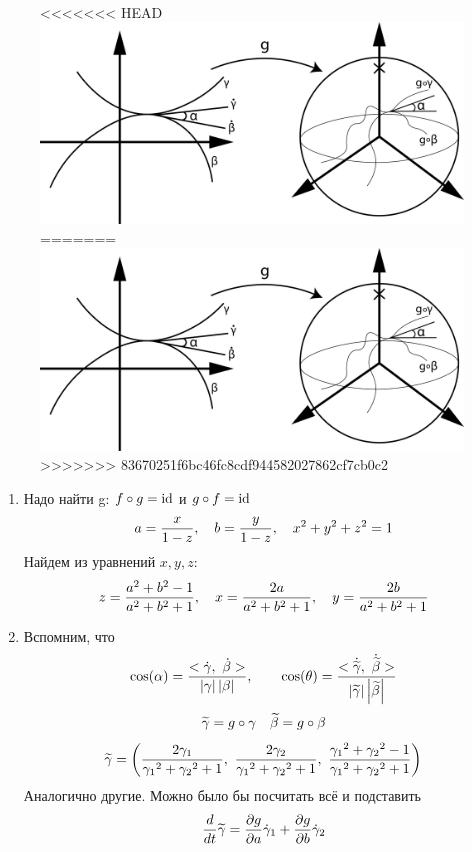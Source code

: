 \documentclass[12pt, fleqn]{article}
\begin{document}
\begin{sol} \
  \begin{figure}[H]
<<<<<<< HEAD
      \includegraphics[scale=0.3]{pics/7_1.png}
=======
      \includegraphics[scale=0.18]{pics/7_1}
>>>>>>> 83670251f6bc46fc8cdf944582027862cf7cb0c2
      \centering
  \end{figure}
  \begin{enumerate}
    \item Надо найти g: $f \circ g = \mathop{\rm id}\nolimits$ и $g \circ f = \mathop{\rm id}\nolimits$
    \[a = \dfrac{x}{1-z},\quad b = \dfrac{y}{1-z},\quad x^2 + y^2 + z^2 = 1\]
    Найдем из уравнений $x,y,z$:
    \[z = \dfrac{a^2 + b^2 - 1}{a^2 + b^2 + 1},\quad
    x = \dfrac{2a}{a^2 + b^2 + 1},\quad
    y=\dfrac{2b}{a^2 + b^2 + 1}\]
    \item Вспомним, что
    \[\cos (\alpha) = \dfrac{<\dot{\gamma},\ \dot{\beta}>}{\abs{\gamma} \abs{\beta}},\qq
    \cos (\theta) = \dfrac{<\dot{\w{\gamma}},\ \dot{\w{\beta}}>}{\abs{\w{\gamma}} \abs{\w{\beta}}}\]
    \[\widetilde{\gamma} = g \circ \gamma\quad \widetilde{\beta} = g \circ \beta\]
    \[\widetilde{\gamma} = \left(
      \dfrac{2 \gamma_1}{{\gamma_1}^2 + {\gamma_2}^2 + 1},\
      \dfrac{2 \gamma_2}{{\gamma_1}^2 + {\gamma_2}^2 + 1},\
      \dfrac{{\gamma_1}^2 + {\gamma_2}^2 - 1}{{\gamma_1}^2 + {\gamma_2}^2 + 1}
    \right)\]
    Аналогично другие. Можно было бы посчитать всё и подставить
    \[\dfrac{d}{dt} \widetilde{\gamma} = \dfrac{\partial g}{\partial a} \dot{\gamma}_1 + \dfrac{\partial g}{\partial b} \dot{\gamma}_2\]

\end{enumerate}
\end{sol}
\end{document}
